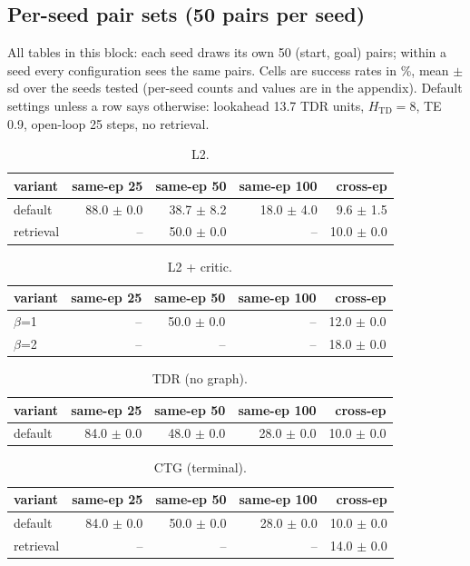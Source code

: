 \subsection*{Per-seed pair sets (50 pairs per seed)}
All tables in this block: each seed draws its own 50 (start, goal) pairs; within a seed every configuration sees the same pairs. Cells are success rates in \%, mean $\pm$ sd over the seeds tested (per-seed counts and values are in the appendix). Default settings unless a row says otherwise: lookahead 13.7 TDR units, $H_{\mathrm{TD}}=8$, TE 0.9, open-loop 25 steps, no retrieval.

\begin{table}[H]
\centering\small
\caption{L2.}
\label{tab:gas-mpc-l2-perseed-n50}
\begin{tabular}{lrrrr}
\toprule
variant & same-ep 25 & same-ep 50 & same-ep 100 & cross-ep \\
\midrule
default & 88.0 $\pm$ 0.0 & 38.7 $\pm$ 8.2 & 18.0 $\pm$ 4.0 & 9.6 $\pm$ 1.5 \\
retrieval & -- & 50.0 $\pm$ 0.0 & -- & 10.0 $\pm$ 0.0 \\
\bottomrule
\end{tabular}
\end{table}

\begin{table}[H]
\centering\small
\caption{L2 + critic.}
\label{tab:gas-mpc-l2-crit-perseed-n50}
\begin{tabular}{lrrrr}
\toprule
variant & same-ep 25 & same-ep 50 & same-ep 100 & cross-ep \\
\midrule
$\beta$=1 & -- & 50.0 $\pm$ 0.0 & -- & 12.0 $\pm$ 0.0 \\
$\beta$=2 & -- & -- & -- & 18.0 $\pm$ 0.0 \\
\bottomrule
\end{tabular}
\end{table}

\begin{table}[H]
\centering\small
\caption{TDR (no graph).}
\label{tab:gas-mpc-tdr-perseed-n50}
\begin{tabular}{lrrrr}
\toprule
variant & same-ep 25 & same-ep 50 & same-ep 100 & cross-ep \\
\midrule
default & 84.0 $\pm$ 0.0 & 48.0 $\pm$ 0.0 & 28.0 $\pm$ 0.0 & 10.0 $\pm$ 0.0 \\
\bottomrule
\end{tabular}
\end{table}

\begin{table}[H]
\centering\small
\caption{CTG (terminal).}
\label{tab:gas-mpc-ctg-perseed-n50}
\begin{tabular}{lrrrr}
\toprule
variant & same-ep 25 & same-ep 50 & same-ep 100 & cross-ep \\
\midrule
default & 84.0 $\pm$ 0.0 & 50.0 $\pm$ 0.0 & 28.0 $\pm$ 0.0 & 10.0 $\pm$ 0.0 \\
retrieval & -- & -- & -- & 14.0 $\pm$ 0.0 \\
\bottomrule
\end{tabular}
\end{table}

